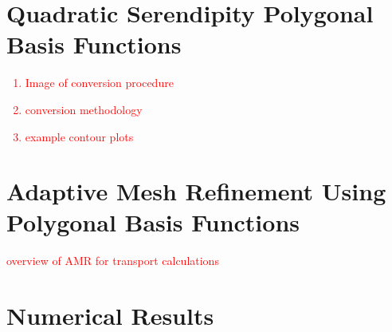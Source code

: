 \documentclass[preprint,10pt]{elsarticle}
\newcommand{\tcr}[1]{\textcolor{red}{#1}}
\newcommand{\BFfigpath}[1]{../../../Document/Rev0/figures/sec_BF/{#1}}
\begin{document}
\section{Quadratic Serendipity Polygonal Basis Functions} \label{sec::quadpoly}

\tcr
{
\begin{enumerate}
\item Image of conversion procedure
\item conversion methodology
\item example contour plots
\end{enumerate}
}

\iffalse
\begin{figure}[hbt]
\centering
\texttt{[image: \\BFfigpath\{linear\_to\_quad\_process.png]}}
\caption{Overview of the process to construct the quadratic serendipity basis functions on polygons. The filled dots correspond to basis functions that maintain the Lagrange property while empty dots do not.}
\label{fig::BF_2D_quad_process}
\end{figure}
\fi

\section{Adaptive Mesh Refinement Using Polygonal Basis Functions} \label{sec::amr}

\tcr{overview of AMR for transport calculations}

\section{Numerical Results} \label{sec::results}

\end{document}
